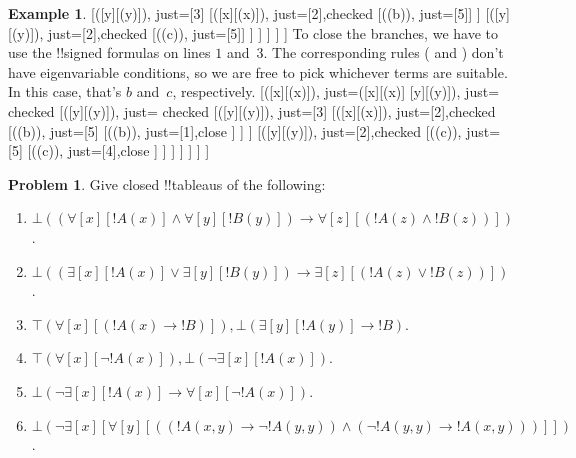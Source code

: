 \documentclass[10pt,a4paper]{article}
\theoremstyle{plain}
\theoremstyle{definition}
\newtheorem{ex}[thm]{Example}
\newtheorem{prob}{Problem}[section]
\theoremstyle{remark}
\newenvironment{oltableau}{}{}
\providecommand{\lif}{\mathbin{\rightarrow}}
\providecommand{\lforall}{\mathord{\forall}}
\providecommand{\lexists}{\mathord{\exists}}
\providecommand{\sFmla}[2]{#1(#2)}
\providecommand{\formula}{\relax}
\providecommand{\True}{\top}
\providecommand{\False}{\bot}
\providecommand{\TAss}[1]{}
\providecommand{\TRule}[1]{}
\providecommand{\formula}[1]{#1}
\begin{document}
\begin{ex}
\begin{oltableau}
        [\sFmla{\False}{\lexists[y][\formula{B}(y)]},
          just={\TRule{\True}{\lnot}[3]}
          [\sFmla{\False}{\lforall[x][\formula{A}(x)]}, just={\TRule{\True}{\lif}[2]},checked
            [\sFmla{\False}{\formula{A}(b)}, just={\TRule{\False}{\lforall}[5]}]
          ]
          [\sFmla{\True}{\lexists[y][\formula{B}(y)]}, just={\TRule{\True}{\lif}[2]},checked
            [\sFmla{\True}{\formula{B}(c)}, just={\TRule{\True}{\lexists}[5]}]
          ]
        ]
      ]
    ]
  ]
\end{oltableau}
To close the branches, we have to use the !!{signed formula}s on lines $1$
and~$3$. The corresponding rules (\TRule{\True}{\lforall} and
\TRule{\False}{\lexists}) don't have eigenvariable conditions, so we
are free to pick whichever terms are suitable. In this case, that's
$b$ and~$c$, respectively.
\begin{oltableau}
  [\sFmla{\True}{\lforall[x][\formula{A}(x)]}, just=\TAss
    [\sFmla{\True}{\lforall[x][\formula{A}(x)] \lif
        \lexists[y][\formula{B}(y)]}, just=\TAss, checked
      [\sFmla{\True}{\lnot\lexists[y][\formula{B}(y)]}, just=\TAss, checked
        [\sFmla{\False}{\lexists[y][\formula{B}(y)]},
          just={\TRule{\True}{\lnot}[3]}
          [\sFmla{\False}{\lforall[x][\formula{A}(x)]},
            just={\TRule{\True}{\lif}[2]},checked
            [\sFmla{\False}{\formula{A}(b)},
              just={\TRule{\False}{\lforall}[5]}
              [\sFmla{\True}{\formula{A}(b)},
                just={\TRule{\True}{\lforall}[1]},close
              ]
            ]
          ]
          [\sFmla{\True}{\lexists[y][\formula{B}(y)]},
            just={\TRule{\True}{\lif}[2]},checked
            [\sFmla{\True}{\formula{B}(c)},
              just={\TRule{\True}{\lexists}[5]}
              [\sFmla{\False}{\formula{B}(c)},
                just={\TRule{\False}{\lexists}[4]},close
              ]
            ]
          ]
        ]
      ]
    ]
  ]
\end{oltableau}
\end{ex}

\begin{prob}
Give closed !!{tableau}s of the following:
\begin{enumerate}
\item $\sFmla{\False}{(\lforall[x][!A(x)] \land \lforall[y][!B(y)])
\lif \lforall[z][(!A(z) \land !B(z))]}$.
\item $\sFmla{\False}{(\lexists[x][!A(x)] \lor \lexists[y][!B(y)])
\lif \lexists[z][(!A(z) \lor !B(z))]}$.
\item $\sFmla{\True}{\lforall[x][(!A(x) \lif !B)]},
\sFmla{\False}{\lexists[y][!A(y)] \lif !B}$.
\item $\sFmla{\True}{\lforall[x][\lnot !A(x)]},
\sFmla{\False}{\lnot\lexists[x][!A(x)]}$.
\item $\sFmla{\False}{\lnot\lexists[x][!A(x)] \lif \lforall[x][\lnot
!A(x)]}$.
\item $\sFmla{\False}{\lnot\lexists[x][\lforall[y][((!A(x,y) \lif
\lnot !A(y,y)) \land (\lnot !A(y,y) \lif !A(x,y)))]]}$.
\end{enumerate}
\end{prob}
\end{document}
